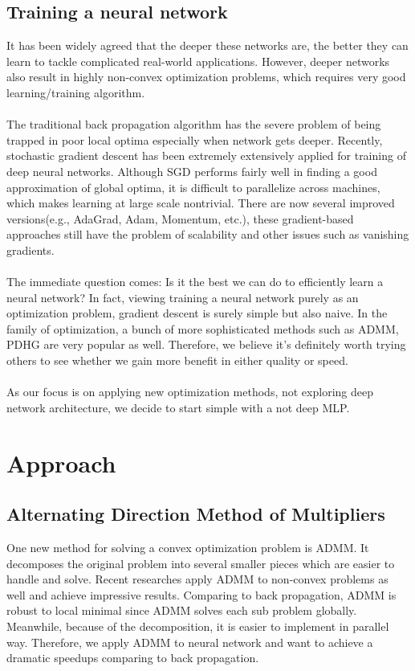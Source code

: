 \documentclass[11pt]{report}
\begin{document}
\subsection*{Training a neural network}
It has been widely agreed that the deeper these networks are, the better they can learn to tackle complicated real-world applications. However, deeper networks also result in highly non-convex optimization problems, which requires very good learning/training algorithm. \\
\\
The traditional back propagation algorithm has the severe problem of being trapped in poor local optima especially when network gets deeper. Recently, stochastic gradient descent has been extremely extensively applied for training of deep neural networks. Although SGD performs fairly well in finding a good approximation of global optima, it is difficult to parallelize across machines, which makes learning at large scale nontrivial.  There are now several improved versions(e.g., AdaGrad, Adam, Momentum, etc.), these gradient-based approaches still have the problem of scalability and other issues such as vanishing gradients.\\
\\
The immediate question comes: Is it the best we can do to efficiently learn a neural network?  In fact, viewing training a neural network purely as an optimization problem, gradient descent is surely simple but also naive.  In the family of optimization, a bunch of more sophisticated methods such as ADMM, PDHG are very popular as well. Therefore, we believe it's definitely worth trying others to see whether we gain more benefit in either quality or speed.
\\\\
As our focus is on applying new optimization methods, not exploring deep network architecture, we decide to start simple with a not deep MLP.

\section*{Approach}
\subsection*{Alternating Direction Method of Multipliers}
One new method for solving a convex optimization problem is ADMM. It decomposes the original problem into several smaller pieces which are easier to handle and solve. Recent researches apply ADMM to non-convex problems as well and achieve impressive results. Comparing to back propagation, ADMM is robust to local minimal since ADMM solves each sub problem globally. Meanwhile, because of the decomposition, it is easier to implement in  parallel way. Therefore, we apply ADMM to neural network and want to achieve a dramatic speedups comparing to back propagation.
\end{document}
